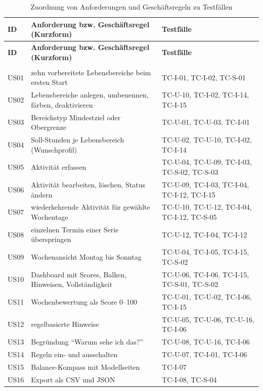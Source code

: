 \begin{longtable}{@{}L{1.5cm}L{9.3cm}L{5.3cm}@{}}
  \caption{Zuordnung von Anforderungen und Geschäftsregeln zu Testfällen}\label{tab:nachverfolgbarkeit}\\
  \toprule
  \textbf{ID} & \textbf{Anforderung bzw. Geschäftsregel (Kurzform)} & \textbf{Testfälle} \\
  \midrule
  \endfirsthead
  \toprule
  \textbf{ID} & \textbf{Anforderung bzw. Geschäftsregel (Kurzform)} & \textbf{Testfälle} \\
  \midrule
  \endhead
  \bottomrule
  \endfoot
   \\*
  US01 & zehn vorbereitete Lebensbereiche beim ersten Start & TC-I-01, TC-I-02, TC-S-01 \\
  US02 & Lebensbereiche anlegen, umbenennen, färben, deaktivieren & TC-U-10, TC-I-02, TC-I-14, TC-I-15 \\
  US03 & Bereichstyp Mindestziel oder Obergrenze & TC-U-01, TC-U-03, TC-I-01 \\
  US04 & Soll-Stunden je Lebensbereich (Wunschprofil) & TC-U-02, TC-U-10, TC-I-02, TC-I-14 \\
  US05 & Aktivität erfassen & TC-U-04, TC-U-09, TC-I-03, TC-S-02, TC-S-03 \\
  US06 & Aktivität bearbeiten, löschen, Status ändern & TC-U-09, TC-I-03, TC-I-04, TC-I-12, TC-I-15 \\
  US07 & wiederkehrende Aktivität für gewählte Wochentage & TC-U-10, TC-U-12, TC-I-04, TC-I-12, TC-S-05 \\
  US08 & einzelnen Termin einer Serie überspringen & TC-U-12, TC-I-04, TC-I-12 \\
  US09 & Wochenansicht Montag bis Sonntag & TC-U-04, TC-I-05, TC-I-15, TC-S-02 \\
  US10 & Dashboard mit Scores, Balken, Hinweisen, Vollständigkeit & TC-U-06, TC-I-06, TC-I-15, TC-S-01, TC-S-02 \\
  US11 & Wochenbewertung als Score 0--100 & TC-U-01, TC-U-02, TC-I-06, TC-I-15 \\
  US12 & regelbasierte Hinweise & TC-U-05, TC-U-06, TC-U-16, TC-I-06 \\
  US13 & Begründung \enquote{Warum sehe ich das?} & TC-U-08, TC-U-16, TC-I-06 \\
  US14 & Regeln ein- und ausschalten & TC-U-07, TC-I-01, TC-I-06 \\
  US15 & Balance-Kompass mit Modellseiten & TC-I-07 \\
  US16 & Export als CSV und JSON & TC-I-08, TC-S-04 \\

\end{longtable}
